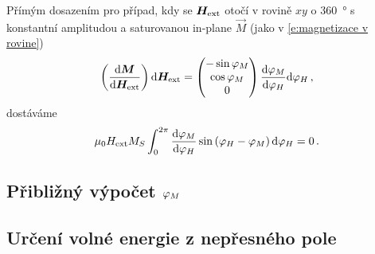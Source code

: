 Přímým dosazením pro případ, kdy se $\bm{H}_\textrm{ext}$ otočí v rovině $xy$ o \SI{360}{\degree} s konstantní amplitudou a saturovanou in-plane $\vec{M}$ (jako v \eqref{e:magnetizace v rovine})
\begin{equation}
    \left( \frac{\textrm{d}\bm{M}}{\textrm{d}\bm{H}_\textrm{ext}} \right) \text{d}\bm{H}_\textrm{ext}=\begin{pmatrix}
    -\sin \varphi_M \\ \cos \varphi_M \\ 0
    \end{pmatrix} \frac{\textrm{d}\varphi_M}{\textrm{d}\varphi_H}  \textrm{d}\varphi_H \,,
\end{equation}
dostáváme
\begin{equation} \label{e:M integracni konstanta dodatek}
\mu_0H_\textrm{ext} M_S \int_{0}^{2\pi}  \frac{\textrm{d}\varphi_M}{\textrm{d}\varphi_H} \sin\left(\varphi_H-\varphi_M\right) \textrm{d}\varphi_H=0 \,.
\end{equation}

\subsection*{Přibližný výpočet $\varphi_M$}

\subsection*{Určení volné energie z nepřesného pole}
